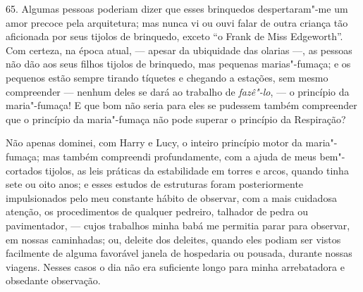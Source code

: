 65. Algumas pessoas poderiam dizer que esses brinquedos despertaram"-me
um amor precoce pela arquitetura; mas nunca vi ou ouvi falar de outra
criança tão aficionada por seus tijolos de brinquedo, exceto ``o Frank
de Miss Edgeworth''. Com certeza, na época atual, --- apesar da
ubiquidade das olarias ---, as pessoas não dão aos seus filhos tijolos de
brinquedo, mas pequenas marias"-fumaça; e os pequenos estão sempre
tirando tíquetes e chegando a estações, sem mesmo compreender --- nenhum
deles se dará ao trabalho de \emph{fazê"-lo}, --- o princípio da
maria"-fumaça! E que bom não seria para eles se pudessem também
compreender que o princípio da maria"-fumaça não pode superar o princípio
da Respiração?

Não apenas dominei, com Harry e Lucy, o inteiro princípio motor da
maria"-fumaça; mas também compreendi profundamente, com a ajuda de meus
bem"-cortados tijolos, as leis práticas da estabilidade em torres e
arcos, quando tinha sete ou oito anos; e esses estudos de estruturas
foram posteriormente impulsionados pelo meu constante hábito de
observar, com a mais cuidadosa atenção, os procedimentos de qualquer
pedreiro, talhador de pedra ou pavimentador, --- cujos trabalhos minha
babá me permitia parar para observar, em nossas caminhadas; ou, deleite
dos deleites, quando eles podiam ser vistos facilmente de alguma
favorável janela de hospedaria ou pousada, durante nossas viagens.
Nesses casos o dia não era suficiente longo para minha arrebatadora e
obsedante observação.

